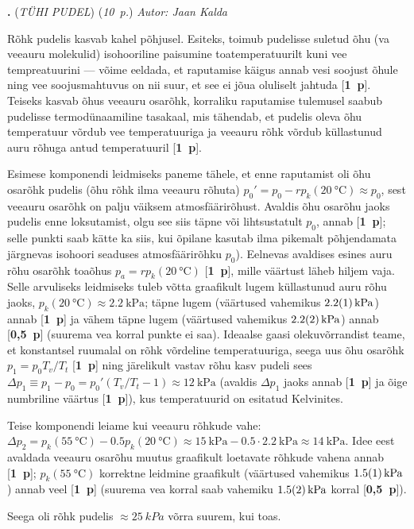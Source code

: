 \documentclass[11pt,a5paper]{article}
\newcommand{\numb}[1]{\vspace{5pt}\textbf{\large #1}}
\newcommand{\nimi}[1]{(\textsl{\small #1})}
\newcommand{\punktid}[1]{(\emph{#1~p.})}
\newcommand{\p}[1]{[\textbf{#1~p}]}
\newcounter{ylesanne}
\newcommand{\yl}[1]{\addtocounter{ylesanne}{1}\numb{\theylesanne.} \nimi{#1} \newblock{}}
\newcommand{\autor}[1]{\emph{Autor: #1}}%
\begin{document}
\yl{TÜHI PUDEL}
\punktid{10} \autor{Jaan Kalda}

Rõhk pudelis kasvab kahel põhjusel. Esiteks, toimub pudelisse suletud õhu (va veeauru molekulid) isohooriline paisumine toatemperatuurilt kuni vee tempreatuurini --- võime eeldada, et raputamise käigus annab vesi soojust õhule ning vee soojusmahtuvus on nii suur, et see ei jõua oluliselt jahtuda \p1. Teiseks kasvab õhus veeauru osarõhk, korraliku raputamise tulemusel saabub pudelisse termodünaamiline tasakaal, mis tähendab, et pudelis oleva õhu temperatuur võrdub vee temperatuuriga ja veeauru rõhk võrdub küllastunud auru rõhuga antud temperatuuril \p1.

Esimese komponendi leidmiseks paneme tähele, et enne raputamist oli õhu osarõhk pudelis (õhu rõhk ilma veeauru rõhuta) $p_0'=p_0-rp_k(\qty{20}\celsius)\approx p_0$, sest veeauru osarõhk on palju väiksem atmosfäärirõhust. Avaldis õhu osarõhu jaoks pudelis enne loksutamist, olgu see siis täpne või lihtsustatult $p_0$, annab \p1; selle punkti saab kätte ka siis, kui õpilane kasutab ilma pikemalt põhjendamata järgnevas isohoori seaduses atmosfäärirõhku $p_0$). Eelnevas avaldises esines auru rõhu osarõhk toaõhus $p_a=rp_k(\qty{20}\celsius)$ \p1, mille väärtust läheb hiljem vaja.  Selle arvuliseks leidmiseks tuleb võtta graafikult lugem küllastunud auru rõhu jaoks, $p_k(\qty{20}\celsius)\approx \qty{2.2}{\kPa}$; täpne lugem (väärtused vahemikus $\qty{2.2\pm 0.1}{\kPa}$) annab \p1 ja vähem täpne lugem (väärtused vahemikus $\qty{2.2\pm 0.2}{\kPa}$) annab \p{0,5} (suurema vea korral punkte ei saa). Ideaalse gaasi olekuvõrrandist teame, et konstantsel ruumalal on rõhk võrdeline temperatuuriga, seega uus õhu osarõhk $p_1= p_0T_v/T_t$ \p1 ning järelikult vastav rõhu kasv pudeli sees $\Delta p_1\equiv p_1-p_0=p_0'(T_v/T_t-1)\approx \SI{12}{\kPa}$ (avaldis $\Delta p_1$ jaoks annab \p1 ja õige numbriline väärtus \p1), kus temperatuurid on esitatud Kelvinites.

Teise komponendi leiame kui veeauru rõhkude vahe: $\Delta p_2 = p_k(\qty{55}{\celsius}) - \num{0.5}p_k(\qty{20}{\celsius}) \approx \SI{15}{\kPa} -\num{0.5}\cdot\qty{2.2}{\kPa}\approx \qty{14}{\kPa}$. Idee eest avaldada veeauru osarõhu muutus graafikult loetavate rõhkude vahena annab \p1; $p_k(\SI{55}\celsius)$ korrektne leidmine graafikult (väärtused vahemikus $\SI{1.5\pm 0.1}{kPa}$)  annab veel \p1 (suurema vea korral saab vahemiku $\SI{1.5\pm 0.2}{kPa}$ korral \p{0,5}).

Seega oli rõhk pudelis $\approx \SI{25}{kPa}$ võrra suurem, kui toas.
\end{document}
